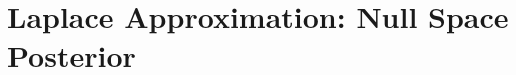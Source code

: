
\providecommand{\R}{\mathbb{R}}

\newenvironment{smallpmatrix}
  {\left(\begin{smallmatrix}}
  {\end{smallmatrix}\right)}

\renewcommand{\paragraph}[1]{\textbf{#1}~~} %

\providecommand{\ding}[1]{\ensuremath{\checkmark}}
\providecommand{\cmark}{\ding{51}}%
\providecommand{\xmark}{\ding{55}}%

\providecommand{\smaller}[2][0.9]{\scalebox{#1}{#2}}

\providecommand{\J}{\mathbf{J}}      %
\providecommand{\U}{\mathbf{U}}      %
\providecommand{\mat}[1]{\mathbf{#1}}
\providecommand{\vec}[1]{\mathbf{#1}}
\providecommand{\x}{\mathbf{x}}
\providecommand{\y}{\mathbf{y}}
\providecommand{\N}{\mathcal{N}}
\providecommand{\T}{^{\top}}
\providecommand\norm[1]{\left\lVert#1\right\rVert}
\providecommand{\trace}{\mathrm{Tr}}
\providecommand{\MAP}{\textnormal{\textsc{map}}}
\providecommand{\GGN}{\mathrm{GGN}}
\providecommand{\LLA}{\textsc{lla}}

\providecommand{\marco}[1]{{\textcolor{purple}{Marco: {#1}} }}
\providecommand{\hrittik}[1]{{\textcolor{blue}{Hrittik: {#1}} }}
\providecommand{\hauberg}[1]{{\textcolor{red}{[Søren says: {#1}]} }}
\providecommand{\first}[1]{\textbf{#1}}


\frenchspacing
{}

\chapter{Laplace Approximation: Null Space Posterior}
\label{ch:laplace_null}

